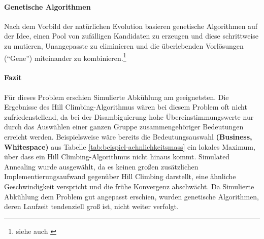 \paragraph{Genetische Algorithmen}
Nach dem Vorbild der natürlichen Evolution basieren genetische Algorithmen auf der Idee, einen Pool von zufälligen Kandidaten zu erzeugen und diese schrittweise zu mutieren, Unangepasste
zu eliminieren und die überlebenden Vorlösungen ("`Gene"') miteinander zu kombinieren.\footnote{siehe auch \citet[S. 142, Abbildung 3.1: \emph{The basic cycle of genetic algorithms}]{global-optimization-algorithms}}

\paragraph{Fazit} Für dieses Problem erschien Simulierte Abkühlung am geeignetsten.
Die Ergebnisse des Hill Climbing-Algorithmus wären bei diesem Problem oft nicht zufriedenstellend, da bei der Disambiguierung hohe Übereinstimmungswerte nur durch das Auswählen einer ganzen Gruppe zusammengehöriger
Bedeutungen erreicht werden. Beispielsweise wäre bereits die Bedeutungsauswahl \textbf{(Business, Whitespace)} aus Tabelle \ref{tab:beispiel-aehnlichkeitsmass}
ein lokales Maximum, über dass ein Hill Climbing-Algorithmus nicht hinaus kommt.
Simulated Annealing wurde ausgewählt, da es keinen großen zusätzlichen Implementierungsaufwand gegenüber Hill
Climbing darstellt, eine ähnliche Geschwindigkeit verspricht und die frühe Konvergenz abschwächt.
Da Simulierte Abkühlung dem Problem gut angepasst erschien, wurden genetische Algorithmen,
deren Laufzeit tendenziell groß ist, nicht weiter verfolgt.

